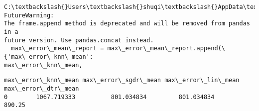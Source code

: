 \documentclass[11pt]{article}
\makeatletter
\newcommand{\boxspacing}{\kern\kvtcb@left@rule\kern\kvtcb@boxsep}
\newcommand{\prompt}[4]{
        {\ttfamily\llap{{\color{#2}[#3]:\hspace{3pt}#4}}\vspace{-\baselineskip}}
    }
\makeatother
\begin{document}
    \begin{Verbatim}[commandchars=\\\{\}]
C:\textbackslash{}Users\textbackslash{}shuqi\textbackslash{}AppData\textbackslash{}Local\textbackslash{}Temp\textbackslash{}ipykernel\_10424\textbackslash{}532847308.py:9: FutureWarning:
The frame.append method is deprecated and will be removed from pandas in a
future version. Use pandas.concat instead.
  max\_error\_mean\_report = max\_error\_mean\_report.append(\{'max\_error\_knn\_mean':
max\_error\_knn\_mean,
    \end{Verbatim}

            \begin{tcolorbox}[breakable, size=fbox, boxrule=.5pt, pad at break*=1mm, opacityfill=0]
\prompt{Out}{outcolor}{96}{\boxspacing}
\begin{Verbatim}[commandchars=\\\{\}]
  max\_error\_knn\_mean max\_error\_sgdr\_mean max\_error\_lin\_mean max\_error\_dtr\_mean
0        1067.719333          801.034834         801.034834             890.25
\end{Verbatim}
\end{tcolorbox}
        
\end{document}

